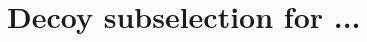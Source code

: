 \documentclass[11pt,oneside,leqno,openright]{report}
\begin{document}
% 
%
% 
%
%
%


%


% 

% 

% 

% 

\chapter{Decoy subselection for ...}


% 
\end{document}

